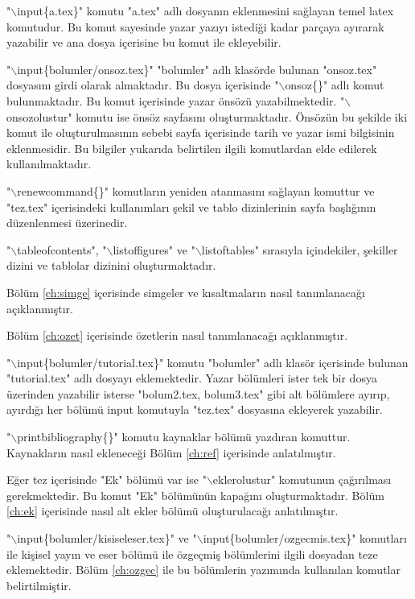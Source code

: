 "$\backslash$input\{a.tex\}" komutu "a.tex" adlı dosyanın eklenmesini sağlayan temel latex komutudur. Bu komut sayesinde yazar yazıyı istediği kadar parçaya ayırarak yazabilir ve ana dosya içerisine bu komut ile ekleyebilir. 

"$\backslash$input\{bolumler/onsoz.tex\}" "bolumler" adlı klasörde bulunan "onsoz.tex" dosyasını girdi olarak almaktadır. Bu dosya içerisinde "$\backslash$onsoz\{\}" adlı komut bulunmaktadır. Bu komut içerisinde yazar önsözü yazabilmektedir. "$\backslash$onsozolustur" komutu ise önsöz sayfasını oluşturmaktadır. Önsözün bu şekilde iki komut ile oluşturulmasının sebebi sayfa içerisinde tarih ve yazar ismi bilgisinin eklenmesidir. Bu bilgiler yukarıda belirtilen ilgili komutlardan elde edilerek kullanılmaktadır. 

"$\backslash$renewcommand\{\}" komutların yeniden atanmasını sağlayan komuttur ve "tez.tex" içerisindeki kullanımları şekil ve tablo dizinlerinin sayfa başlığının düzenlenmesi üzerinedir.

"$\backslash$tableofcontents", "$\backslash$listoffigures" ve "$\backslash$listoftables" sırasıyla içindekiler, şekiller dizini ve tablolar dizinini oluşturmaktadır. 

Bölüm \ref{ch:simge} içerisinde simgeler ve kısaltmaların nasıl tanımlanacağı açıklanmıştır.

Bölüm \ref{ch:ozet} içerisinde özetlerin nasıl tanımlanacağı açıklanmıştır.

"$\backslash$input\{bolumler/tutorial.tex\}" komutu "bolumler" adlı klasör içerisinde bulunan "tutorial.tex" adlı dosyayı eklemektedir. Yazar bölümleri ister tek bir dosya üzerinden yazabilir isterse "bolum2.tex, bolum3.tex" gibi alt bölümlere ayırıp, ayırdığı her bölümü input komutuyla "tez.tex" dosyasına ekleyerek yazabilir.

"$\backslash$printbibliography\{\}" komutu kaynaklar bölümü yazdıran komuttur. Kaynakların nasıl ekleneceği Bölüm \ref{ch:ref} içerisinde anlatılmıştır.

Eğer tez içerisinde "Ek" bölümü var ise "$\backslash$eklerolustur" komutunun çağırılması gerekmektedir. Bu komut "Ek" bölümünün kapağını oluşturmaktadır. Bölüm \ref{ch:ek} içerisinde nasıl alt ekler bölümü oluşturulacağı anlatılmıştır. 

"$\backslash$input\{bolumler/kisiseleser.tex\}" ve "$\backslash$input\{bolumler/ozgecmis.tex\}" komutları ile kişisel yayın ve eser bölümü ile özgeçmiş bölümlerini ilgili dosyadan teze eklemektedir. Bölüm \ref{ch:ozgec} ile bu bölümlerin yazımında kullanılan komutlar belirtilmiştir.

